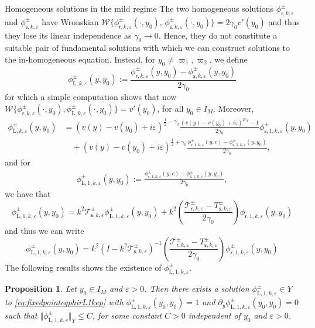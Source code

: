 \documentclass[11pt,reqno]{amsproc}
\makeatletter
\renewcommand\subsection{\@startsection{subsection}{2}%
\normalparindent{.5\linespacing\@plus.7\linespacing}{-.5em}
{\normalfont\bfseries}}
\newtheorem{proposition}{Proposition}[section]
\theoremstyle{definition}
\numberwithin{equation}{section}
\newcommand{\rL}{{\mathrm{L}}}
\newcommand{\sr}{{\mathsf{r}}}
\newcommand{\s}{{\mathsf{s}}}
\newcommand{\cT}{{\mathcal T}}
\newcommand{\ep}{\varepsilon}
\makeatother
\begin{document}
\subsection{Homogeneous solutions in the mild regime}\label{subsec:mild}
The two homogeneous solutions $\phi_{\sr,k,\ep}^\pm$ and $\phi_{\s,k,\ep}^\pm$ have Wronskian $\mathcal{W}\lbrace \phi_{\sr,k,\ep}^\pm(\cdot,y_0),\, \phi_{\s,k,\ep}^\pm(\cdot,y_0) \rbrace = 2\gamma_0v'(y_0)$ and thus they lose its linear independence as $\gamma_0\rightarrow 0$. Hence, they do not constitute a suitable pair of fundamental solutions with which we can construct solutions to the in-homogeneous equation. Instead, for $y_0\neq \varpi_1, \varpi_2$,  we define
\begin{equation}\label{eq:defphiL}
\phi_{\mathrm{L},k,\ep}^\pm(y,y_0) := \frac{\phi_{\sr,k,\ep}^\pm(y,y_0) - \phi_{\s,k,\ep}^\pm(y,y_0)}{2\gamma_0}
\end{equation}
for which a simple computation shows that now $\mathcal{W}\lbrace \phi_{\sr,k,\ep}^\pm(\cdot,y_0), \phi_{\rL,k,\ep}^\pm(\cdot,y_0) \rbrace = v'(y_0)$, for all $y_0\in I_M$. Moreover,
\begin{align*}
\phi_{\rL,k,\ep}^\pm(y,y_0) &= (v(y) - v(y_0) + i\ep)^{\frac12-\gamma_0} \frac{(v(y) - v(y_0) + i\ep)^{2\gamma_0} -1}{2\gamma_0}\phi_{\s,1,k,\ep}^\pm(y,y_0) \\
&\quad+ (v(y) - v(y_0) + i\ep)^{\frac12+\gamma_0}\frac{\phi_{\sr,1,k,\ep}^\pm(y,c) - \phi_{\s,1,k,\ep}^\pm(y,y_0)}{2\gamma_0} ,
\end{align*}
and for 
\begin{align*}
\phi_{\rL,1,k,\ep}^\pm(y,y_0) := \frac{\phi_{\sr,1,k,\ep}^\pm(y,c) - \phi_{\s,1,k,\ep}^\pm(y,y_0)}{2\gamma_0}, 
\end{align*}
we have that
\begin{equation}\label{eq:fixedpointeqphirL1kep}
\phi_{\rL,1,k,\ep}^\pm(y,y_0) = k^2 \cT_{\s,k,\ep}^\pm \phi_{\rL,1,k,\ep}^\pm(y,y_0) +k^2 \left(\frac{\cT_{\sr,k,\ep}^\pm-T_{\s,k,\ep}^\pm}{2\gamma_0} \right)\phi_{\sr,1,k,\ep}(y,y_0)
\end{equation}
and thus we can write
\begin{equation}\label{eq:phirLformula}
\phi_{\rL,1,k,\ep}^\pm(y,y_0) = k^2\left( I - k^2 \cT_{\s,k,\ep}^\pm\right)^{-1}\left( \frac{\cT_{\sr,k,\ep}^\pm-T_{\s,k,\ep}^\pm}{2\gamma_0}\right)\phi_{\sr,1,k,\ep}^\pm(y,y_0)
\end{equation}
The following results shows the existence of $\phi_{\rL,1,k,\ep}^\pm$.

\begin{proposition}\label{prop:existencephirL1kep}
Let $y_0\in I_M$ and $\ep>0$. Then there exists a solution $\phi_{\rL,1,k,\ep}^\pm\in Y$ to  \eqref{eq:fixedpointeqphirL1kep} with $
\phi_{\rL,1,k,\ep}^\pm(y_0,y_0) = 1$ and  $\partial_y\phi_{\rL,1,k,\ep}^\pm(y_0,y_0) = 0$ such that $\Vert \phi_{\rL,1,k,\ep}^\pm \Vert_Y \leq C$, for some constant $C>0$ independent of $y_0$ and $\ep>0$. 
\end{proposition}
\end{document}
